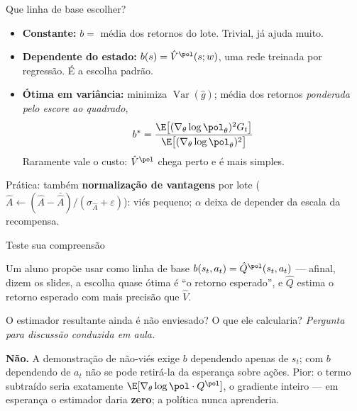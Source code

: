 \documentclass[aspectratio=169, 11pt]{beamer}
\newcommand{\paradiscussao}{\smallskip
  {\footnotesize\color{rlCinza}\itshape Pergunta para discussão conduzida em aula.}}
\newcommand{\thv}{\theta}                       %
\newcommand{\wv}{w}                             %
\newcommand{\polth}{\pol_{\thv}}                %
\newcommand{\gth}{\nabla_{\thv}}                %
\newcommand{\Vhat}{\hat{V}}
\newcommand{\Qhat}{\hat{Q}}
\newcommand{\Ahat}{\hat{A}}
\newcommand{\Var}{\operatorname{Var}}
\begin{document}
\begin{frame}{Que linha de base escolher?}

  \begin{itemize}\setlength{\itemsep}{0.45ex}
    \item \textbf{Constante:} $b = $ média dos retornos do lote. Trivial,
      já ajuda muito.
    \item \textbf{Dependente do estado:} $b(s) = \Vhat^{\pol}(s;\wv)$, uma
      rede treinada por regressão. É a escolha padrão.
    \item \textbf{Ótima em variância:} minimiza $\Var(\hat g)$; média dos
      retornos \emph{ponderada pelo escore ao quadrado},
      \[
        b^{*} = \frac{\E\bigl[(\gth\log\polth)^2 G_t\bigr]}
                     {\E\bigl[(\gth\log\polth)^2\bigr]}
      \]
      Raramente vale o custo: $\Vhat^{\pol}$ chega perto e é mais simples.
  \end{itemize}

  \begin{alertabox}
    Prática: também \textbf{normalização de vantagens} por lote
    ($\Ahat \leftarrow (\Ahat - \bar{\Ahat})/(\sigma_{\Ahat} + \varepsilon)$):
    viés pequeno; $\alpha$ deixa de depender da escala da recompensa.
  \end{alertabox}
\end{frame}

\begin{frame}{Teste sua compreensão}

  \begin{quizbox}{}
    Um aluno propõe usar como linha de base
    $b(s_t,a_t) = \Qhat^{\pol}(s_t,a_t)$ --- afinal, dizem os slides, a
    escolha quase ótima é ``o retorno esperado'', e $\Qhat$ estima o retorno
    esperado com mais precisão que $\Vhat$.

    \smallskip
    O estimador resultante ainda é não enviesado? O que ele calcularia?
    \paradiscussao
  \end{quizbox}

  \pause

  \begin{respbox}
    \textbf{Não.} A demonstração de não-viés exige $b$ dependendo apenas de
    $s_t$; com $b$ dependendo de $a_t$ não se pode retirá-la da esperança
    sobre ações. Pior: o termo subtraído seria exatamente
    $\E[\gth\log\pol \cdot Q^{\pol}]$, o gradiente inteiro --- em esperança o
    estimador daria \textbf{zero}; a política nunca aprenderia.
  \end{respbox}
\end{frame}
\end{document}
